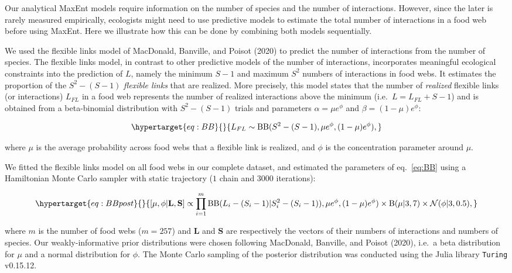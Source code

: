 \documentclass[10pt,oneside]{article}
\begin{document}
Our analytical MaxEnt models require information on the number of
species and the number of interactions. However, since the later is
rarely measured empirically, ecologists might need to use predictive
models to estimate the total number of interactions in a food web before
using MaxEnt. Here we illustrate how this can be done by combining both
models sequentially.

We used the flexible links model of MacDonald, Banville, and Poisot
(2020) to predict the number of interactions from the number of species.
The flexible links model, in contrast to other predictive models of the
number of interactions, incorporates meaningful ecological constraints
into the prediction of \(L\), namely the minimum \(S-1\) and maximum
\(S^2\) numbers of interactions in food webs. It estimates the
proportion of the \(S^2 - (S - 1)\) \emph{flexible links} that are
realized. More precisely, this model states that the number of
\emph{realized} flexible links (or interactions) \(L_{FL}\) in a food
web represents the number of realized interactions above the minimum
(i.e.~\(L = L_{FL} + S - 1\)) and is obtained from a beta-binomial
distribution with \(S^2 - (S - 1)\) trials and parameters
\(\alpha = \mu e^\phi\) and \(\beta = (1 - \mu) e^\phi\):

\begin{equation}\protect\hypertarget{eq:BB}{}{L_{FL} \sim \mathrm{BB}(S^2 - (S - 1), \mu e^\phi, (1 - \mu) e^\phi),}\label{eq:BB}\end{equation}

where \(\mu\) is the average probability across food webs that a
flexible link is realized, and \(\phi\) is the concentration parameter
around \(\mu\).

We fitted the flexible links model on all food webs in our complete
dataset, and estimated the parameters of eq.~\ref{eq:BB} using a
Hamiltonian Monte Carlo sampler with static trajectory (\(1\) chain and
\(3000\) iterations):

\begin{equation}\protect\hypertarget{eq:BBpost}{}{ [\mu, \phi| \textbf{L}, \textbf{S}] \propto \prod_{i = 1}^{m} \mathrm{BB}(L_i - (S_i - 1) | S_i^2 - (S_i - 1)), \mu e^{\phi}, (1 - \mu) e^\phi) \times \mathrm{B}(\mu| 3 , 7 ) \times \mathcal{N}(\phi | 3, 0.5), }\label{eq:BBpost}\end{equation}

where \(m\) is the number of food webs (\(m = 257\)) and \(\textbf{L}\)
and \(\textbf{S}\) are respectively the vectors of their numbers of
interactions and numbers of species. Our weakly-informative prior
distributions were chosen following MacDonald, Banville, and Poisot
(2020), i.e.~a beta distribution for \(\mu\) and a normal distribution
for \(\phi\). The Monte Carlo sampling of the posterior distribution was
conducted using the Julia library \texttt{Turing} v0.15.12.
\end{document}
